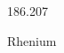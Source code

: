 \documentclass[12pt]{article}
\begin{document}
\hfill{}
\vfill
\begin{center}
  {\fontsize{50}{60}
  }

  186.207

Rhenium
\end{center}
\vfill
\end{document}
